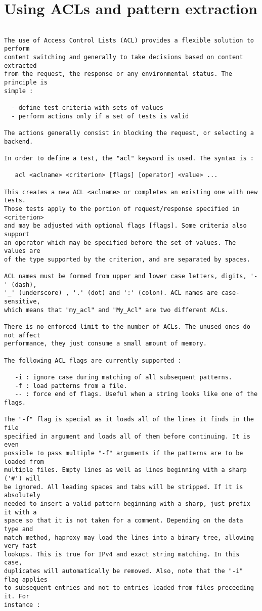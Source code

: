 
\chapter{Using ACLs and pattern extraction}

\begin{verbatim}

The use of Access Control Lists (ACL) provides a flexible solution to perform
content switching and generally to take decisions based on content extracted
from the request, the response or any environmental status. The principle is
simple :

  - define test criteria with sets of values
  - perform actions only if a set of tests is valid

The actions generally consist in blocking the request, or selecting a backend.

In order to define a test, the "acl" keyword is used. The syntax is :

   acl <aclname> <criterion> [flags] [operator] <value> ...

This creates a new ACL <aclname> or completes an existing one with new tests.
Those tests apply to the portion of request/response specified in <criterion>
and may be adjusted with optional flags [flags]. Some criteria also support
an operator which may be specified before the set of values. The values are
of the type supported by the criterion, and are separated by spaces.

ACL names must be formed from upper and lower case letters, digits, '-' (dash),
'_' (underscore) , '.' (dot) and ':' (colon). ACL names are case-sensitive,
which means that "my_acl" and "My_Acl" are two different ACLs.

There is no enforced limit to the number of ACLs. The unused ones do not affect
performance, they just consume a small amount of memory.

The following ACL flags are currently supported :

   -i : ignore case during matching of all subsequent patterns.
   -f : load patterns from a file.
   -- : force end of flags. Useful when a string looks like one of the flags.

The "-f" flag is special as it loads all of the lines it finds in the file
specified in argument and loads all of them before continuing. It is even
possible to pass multiple "-f" arguments if the patterns are to be loaded from
multiple files. Empty lines as well as lines beginning with a sharp ('#') will
be ignored. All leading spaces and tabs will be stripped. If it is absolutely
needed to insert a valid pattern beginning with a sharp, just prefix it with a
space so that it is not taken for a comment. Depending on the data type and
match method, haproxy may load the lines into a binary tree, allowing very fast
lookups. This is true for IPv4 and exact string matching. In this case,
duplicates will automatically be removed. Also, note that the "-i" flag applies
to subsequent entries and not to entries loaded from files preceeding it. For
instance :


\end{verbatim}
